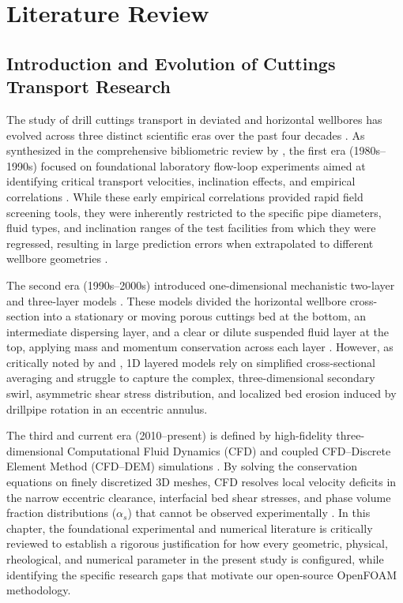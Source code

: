 
\chapter{Literature Review}

\section{Introduction and Evolution of Cuttings Transport Research}
The study of drill cuttings transport in deviated and horizontal wellbores has evolved across three distinct scientific eras over the past four decades \citep{Li2026, Khalili2025}. As synthesized in the comprehensive bibliometric review by \citet{Li2026}, the first era (1980s--1990s) focused on foundational laboratory flow-loop experiments aimed at identifying critical transport velocities, inclination effects, and empirical correlations \citep{Tomren1986, Sanchez1999}. While these early empirical correlations provided rapid field screening tools, they were inherently restricted to the specific pipe diameters, fluid types, and inclination ranges of the test facilities from which they were regressed, resulting in large prediction errors when extrapolated to different wellbore geometries \citep{Sorgun2010, Li2026}.

The second era (1990s--2000s) introduced one-dimensional mechanistic two-layer and three-layer models \citep{Gavignet1989, Kamp1999, Hyun2000}. These models divided the horizontal wellbore cross-section into a stationary or moving porous cuttings bed at the bottom, an intermediate dispersing layer, and a clear or dilute suspended fluid layer at the top, applying mass and momentum conservation across each layer \citep{Sorgun2010, Li2026}. However, as critically noted by \citet{Kamp1999} and \citet{Sorgun2010}, 1D layered models rely on simplified cross-sectional averaging and struggle to capture the complex, three-dimensional secondary swirl, asymmetric shear stress distribution, and localized bed erosion induced by drillpipe rotation in an eccentric annulus.

The third and current era (2010--present) is defined by high-fidelity three-dimensional Computational Fluid Dynamics (CFD) and coupled CFD--Discrete Element Method (CFD--DEM) simulations \citep{Shehab2015, Hajipour2020, Khaled2020, Li2026}. By solving the conservation equations on finely discretized 3D meshes, CFD resolves local velocity deficits in the narrow eccentric clearance, interfacial bed shear stresses, and phase volume fraction distributions ($\alpha_s$) that cannot be observed experimentally \citep{Li2026}. In this chapter, the foundational experimental and numerical literature is critically reviewed to establish a rigorous justification for how every geometric, physical, rheological, and numerical parameter in the present study is configured, while identifying the specific research gaps that motivate our open-source OpenFOAM methodology.

